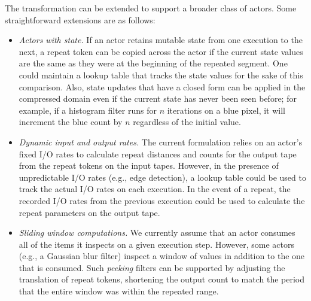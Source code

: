 The transformation can be extended to support a broader class of
actors.  Some straightforward extensions are as follows:
\begin{itemize}

\item {\it Actors with state.}  If an actor retains mutable state from
one execution to the next, a repeat token can be copied across the
actor if the current state values are the same as they were at the
beginning of the repeated segment.  One could maintain a lookup table
that tracks the state values for the sake of this comparison.  Also,
state updates that have a closed form can be applied in the compressed
domain even if the current state has never been seen before; for
example, if a histogram filter runs for $n$ iterations on a blue
pixel, it will increment the blue count by $n$ regardless of the
initial value.

\item {\it Dynamic input and output rates.}  The current formulation
relies on an actor's fixed I/O rates to calculate repeat distances and
counts for the output tape from the repeat tokens on the input tapes.
However, in the presence of unpredictable I/O rates (e.g., edge
detection), a lookup table could be used to track the actual I/O rates
on each execution.  In the event of a repeat, the recorded I/O rates
from the previous execution could be used to calculate the repeat
parameters on the output tape.

\item {\it Sliding window computations.}  We currently assume that an
actor consumes all of the items it inspects on a given execution step.
However, some actors (e.g., a Gaussian blur filter) inspect a window
of values in addition to the one that is consumed.  Such {\it peeking}
filters can be supported by adjusting the translation of repeat
tokens, shortening the output count to match the period that the
entire window was within the repeated range.

\end{itemize}
